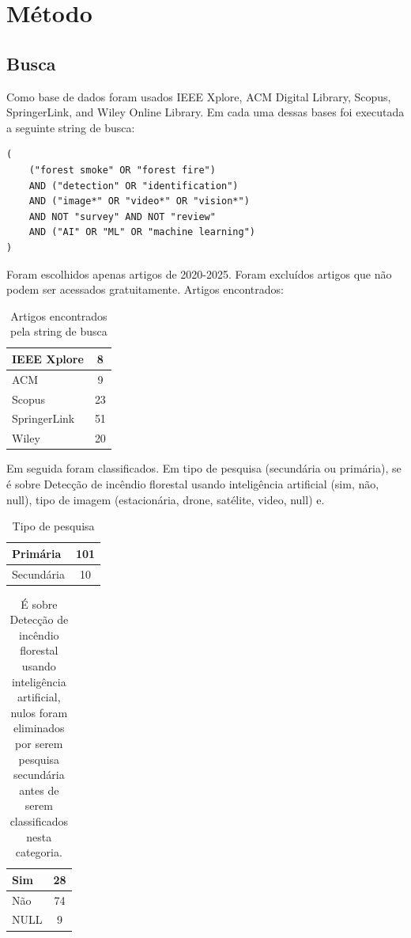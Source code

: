 \chapter{Método}
\label{metodo}
\section{Busca}
Como base de dados foram usados IEEE Xplore, ACM Digital Library, Scopus, SpringerLink, and Wiley Online Library.
Em cada uma dessas bases foi executada a seguinte string de busca:
\begin{verbatim}
(
    ("forest smoke" OR "forest fire")
    AND ("detection" OR "identification")
    AND ("image*" OR "video*" OR "vision*")
    AND NOT "survey" AND NOT "review"
    AND ("AI" OR "ML" OR "machine learning")
)
\end{verbatim}
Foram escolhidos apenas artigos de 2020-2025.
Foram excluídos artigos que não podem ser acessados gratuitamente.
Artigos encontrados:
\begin{table}[h]
\centering
\begin{tabular}{ |l c| }
    \hline
    IEEE Xplore &  8 \\
    \hline
    ACM &  9 \\
    \hline
    Scopus & 23 \\
    \hline
    SpringerLink & 51 \\
    \hline
    Wiley & 20 \\
    \hline
\end{tabular}
\caption{Artigos encontrados pela string de busca}
\label{found_papers}
\end{table}

Em seguida foram classificados. Em tipo de pesquisa (secundária ou primária), se é sobre Detecção de incêndio florestal usando inteligência artificial (sim, não, null), tipo de imagem (estacionária, drone, satélite, video, null) e.
\begin{table}[h]
\centering
\begin{tabular}{ |l c| }
    \hline
    Primária & 101 \\
    \hline
    Secundária & 10 \\
    \hline
\end{tabular}
\caption{Tipo de pesquisa}
\label{research_type}
\end{table}

\begin{table}[h]
\centering
\begin{tabular}{ |l c| }
    \hline
    Sim & 28 \\
    \hline
    Não & 74 \\
    \hline
    NULL & 9 \\
    \hline
\end{tabular}
\caption{É sobre Detecção de incêndio florestal usando inteligência artificial, nulos foram eliminados por serem pesquisa secundária antes de serem classificados nesta categoria.}
\label{isaboutforestfire}
\end{table}


